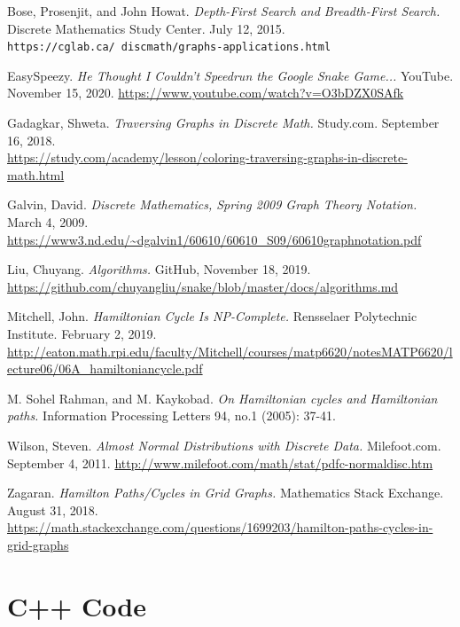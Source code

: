 \documentclass[12pt]{article}
\begin{document}
\pagebreak
\begin{thebibliography}{9}
Bose, Prosenjit, and John Howat. \textit{Depth-First Search and Breadth-First Search.} Discrete Mathematics Study Center. July 12, 2015. \\\texttt{https://cglab.ca/~discmath/graphs-applications.html}

EasySpeezy. \textit{He Thought I Couldn't Speedrun the Google Snake Game...} YouTube. November 15, 2020. \url{https://www.youtube.com/watch?v=O3bDZX0SAfk}

Gadagkar, Shweta. \textit{Traversing Graphs in Discrete Math.} Study.com. September 16, 2018. \\\url{https://study.com/academy/lesson/coloring-traversing-graphs-in-discrete-math.html}

Galvin, David. \textit{Discrete Mathematics, Spring 2009 Graph Theory Notation.} March 4, 2009. \url{https://www3.nd.edu/~dgalvin1/60610/60610_S09/60610graphnotation.pdf}

Liu, Chuyang. \textit{Algorithms.} GitHub, November 18, 2019. \\\url{https://github.com/chuyangliu/snake/blob/master/docs/algorithms.md}

Mitchell, John. \textit{Hamiltonian Cycle Is NP-Complete.} Rensselaer Polytechnic Institute. February 2, 2019. \\\url{http://eaton.math.rpi.edu/faculty/Mitchell/courses/matp6620/notesMATP6620/lecture06/06A_hamiltoniancycle.pdf}

M. Sohel Rahman, and M. Kaykobad. \textit{On Hamiltonian cycles and Hamiltonian paths.} Information Processing Letters 94, no.1 (2005): 37-41.

Wilson, Steven. \textit{Almost Normal Distributions with Discrete Data.} Milefoot.com. September 4, 2011. \url{http://www.milefoot.com/math/stat/pdfc-normaldisc.htm}

Zagaran. \textit{Hamilton Paths/Cycles in Grid Graphs.} Mathematics Stack Exchange. August 31, 2018. \\\url{https://math.stackexchange.com/questions/1699203/hamilton-paths-cycles-in-grid-graphs}
\end{thebibliography}
\pagebreak

\appendix
\appendixpage
\section{C++ Code}\label{sec:appendix_code}
\end{document}

